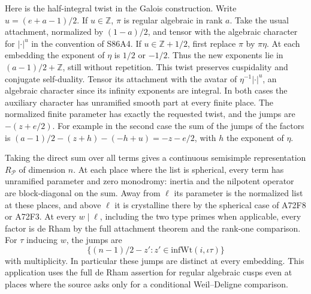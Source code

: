 Here is the half-integral twist in the Galois construction. Write
$u=(e+a-1)/2$. If $u\in\mathbb Z$, $\pi$ is regular algebraic
in rank $a$. Take the usual attachment, normalized by $(1-a)/2$,
and tensor with the algebraic character for $|\cdot|^u$ in the
convention of S86A4. If $u\in\mathbb Z+1/2$, first replace
$\pi$ by $\pi\eta$. At each embedding the exponent of $\eta$
is $1/2$ or $-1/2$. Thus the new exponents lie in
$(a-1)/2+\mathbb Z$, still without repetition. This twist preserves
cuspidality and conjugate self-duality. Tensor its attachment with
the avatar of $\eta^{-1}|\cdot|^u$, an algebraic character since
its infinity exponents are integral. In both cases the auxiliary
character has unramified smooth part at every finite place. The
normalized finite parameter has exactly the requested twist, and
the jumps are $-(z+e/2)$. For example in the second case the sum of
the jumps of the factors is
$(a-1)/2-(z+h)-(-h+u)=-z-e/2$, with $h$ the exponent of $\eta$.

Taking the direct sum over all terms gives a continuous semisimple
representation $R_{\mathcal P}$ of dimension $n$. At each place
where the list is spherical, every term has unramified parameter
and zero monodromy: inertia and the nilpotent operator are
block-diagonal on the sum. Away from $\ell$ its parameter is the
normalized list at these places, and above $\ell$ it is crystalline
there by the spherical case of A72F8 or A72F3. At every $w\mid\ell$,
including the two type primes when applicable, every factor is de
Rham by the full attachment theorem and the rank-one comparison.
For $\tau$ inducing $w$, the jumps are
\[
        \bigl\{(n-1)/2-z':z'\in\mathrm{infWt}(i,\iota\tau)\bigr\}
\]
with multiplicity. In particular these jumps are distinct at every
embedding. This application uses the full de Rham assertion for
regular algebraic cusps even at places where the source asks only
for a conditional Weil--Deligne comparison.

